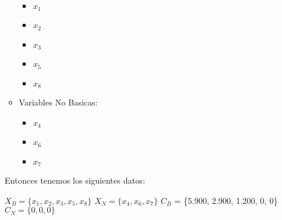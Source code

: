 \documentclass[10pt,a4paper]{article}
\begin{document}
\begin{enumerate}[label=\textbf{\sffamily\large\arabic*.}]
\begin{itemize}
\begin{itemize}
            \item $x_{1}$
            \item $x_{2}$
            \item $x_{3}$
            \item $x_{5}$
            \item $x_{8}$\\
    
        \end{itemize}
        \item Variables No Basicas:
        \begin{itemize}

            \item $x_{4}$
            \item $x_{6}$
            \item $x_{7}$
    
        \end{itemize}

    \end{itemize}

    Entonces tenemos los siguientes datos:\\

    \begin{center}
    $X_{B} = \{x_{1}, x_{2}, x_{3}, x_{5}, x_{8}\}$ \hspace{1em} $X_{N} = \{x_{4}, x_{6}, x_{7}\}$ 
    \hspace{1em} $C_{B}$ = \{5.900, 2.900, 1.200, 0, 0\} \hspace{1em} $C_{N} = \{0, 0, 0\}$\\
    \end{center}


\end{enumerate}
\end{document}
